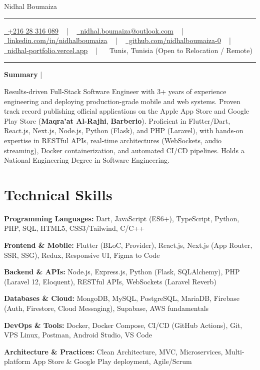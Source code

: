 \documentclass[letterpaper,10pt]{article}
\newcommand{\documentTitle}[2]{
  \begin{center}
    {\Huge\color{accentTitle} #1}
    \vspace{8pt}
    
    {\color{accentLine} \hrule}
    \vspace{3pt}
    \footnotesize{#2}
    \vspace{3pt}
    {\color{accentLine} \hrule}
  \end{center}
}
\newcommand{\tinysection}[1]{
  \phantomsection
  \addcontentsline{toc}{section}{#1}
  {\large{\bfseries\color{accentText}#1} {\color{accentLine} |}}
}
\newenvironment{resume_list}{
  \vspace{-7pt}
  \begin{itemize}[itemsep=-2pt, parsep=1pt, leftmargin=30pt]
}{
  \end{itemize}
}
\begin{document}
\documentTitle{Nidhal Boumaiza}{
  \href{tel:+21628316089}{\raisebox{-0.05\height} \faPhone\ +216 28 316 089} ~ | ~
  \href{mailto:nidhal.boumaiza@outlook.com}{\raisebox{-0.15\height} \faEnvelope\ nidhal.boumaiza@outlook.com} ~ | ~
  \href{https://linkedin.com/in/nidhalboumaiza}{\raisebox{-0.15\height} \faLinkedin\ linkedin.com/in/nidhalboumaiza} ~ | ~
  \href{https://github.com/nidhalboumaiza-0}{\raisebox{-0.15\height} \faGithub\ github.com/nidhalboumaiza-0} ~ | ~
  \href{https://nidhal-portfolio.vercel.app}{\raisebox{-0.15\height} \faGlobe\ nidhal-portfolio.vercel.app} ~ | ~
  \raisebox{-0.05\height} \faMapMarker*\ Tunis, Tunisia (Open to Relocation / Remote)
}

\tinysection{Summary}
Results-driven Full-Stack Software Engineer with 3+ years of experience engineering and deploying production-grade mobile and web systems. Proven track record publishing official applications on the Apple App Store and Google Play Store (\textbf{Maqra'at Al-Rajhi}, \textbf{Barberio}). Proficient in Flutter/Dart, React.js, Next.js, Node.js, Python (Flask), and PHP (Laravel), with hands-on expertise in RESTful APIs, real-time architectures (WebSockets, audio streaming), Docker containerization, and automated CI/CD pipelines. Holds a National Engineering Degree in Software Engineering.

\section{Technical Skills}
\begin{resume_list}
  \item \textbf{Programming Languages:} Dart, JavaScript (ES6+), TypeScript, Python, PHP, SQL, HTML5, CSS3/Tailwind, C/C++
  \item \textbf{Frontend \& Mobile:} Flutter (BLoC, Provider), React.js, Next.js (App Router, SSR, SSG), Redux, Responsive UI, Figma to Code
  \item \textbf{Backend \& APIs:} Node.js, Express.js, Python (Flask, SQLAlchemy), PHP (Laravel 12, Eloquent), RESTful APIs, WebSockets (Laravel Reverb)
  \item \textbf{Databases \& Cloud:} MongoDB, MySQL, PostgreSQL, MariaDB, Firebase (Auth, Firestore, Cloud Messaging), Supabase, AWS fundamentals
  \item \textbf{DevOps \& Tools:} Docker, Docker Compose, CI/CD (GitHub Actions), Git, VPS Linux, Postman, Android Studio, VS Code
  \item \textbf{Architecture \& Practices:} Clean Architecture, MVC, Microservices, Multi-platform App Store \& Google Play deployment, Agile/Scrum
\end{resume_list}
\end{document}
